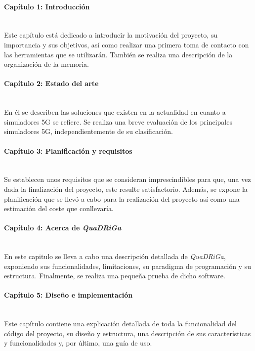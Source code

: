 \paragraph{Capítulo 1: Introducción} \mbox{} \\
	Este capítulo está dedicado a introducir la motivación del proyecto, su importancia y sus objetivos, así como realizar una primera toma de contacto con las herramientas que se utilizarán. También se realiza una descripción de la organización de la memoria.

\paragraph{Capítulo 2: Estado del arte} \mbox{} \\
	En él se describen las soluciones que existen en la actualidad en cuanto a simuladores 5G se refiere. Se realiza una breve evaluación de los principales simuladores 5G, independientemente de su clasificación.

\paragraph{Capítulo 3: Planificación y requisitos} \mbox{} \\
	Se establecen unos requisitos que se consideran imprescindibles para que, una vez dada la finalización del proyecto, este resulte satisfactorio. Además, se expone la planificación que se llevó a cabo para la realización del proyecto así como una estimación del coste que conllevaría.

\paragraph{Capítulo 4: Acerca de \textit{QuaDRiGa}} \mbox{} \\
	En este capitulo se lleva a cabo una descripción detallada de \textit{QuaDRiGa}, exponiendo sus funcionalidades, limitaciones, su paradigma de programación y su estructura. Finalmente, se realiza una pequeña prueba de dicho software.

\paragraph{Capítulo 5: Diseño e implementación} \mbox{} \\
    Este capítulo contiene una explicación detallada de toda la funcionalidad del código del proyecto, su diseño y estructura, una descripción de sus características y funcionalidades y, por último, una guía de uso.


